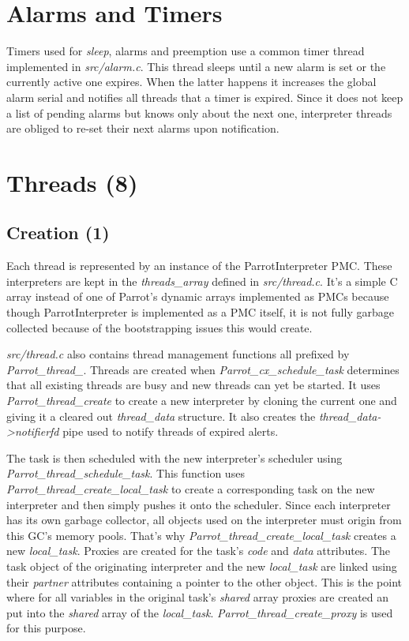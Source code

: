 \documentclass[bachelor,english]{hgbthesis}
\begin{document}
\section{Alarms and Timers}

Timers used for \textit{sleep}, alarms and preemption use a common timer thread implemented in \textit{src/alarm.c}. This thread sleeps until a new alarm is set or the currently active one expires. When the latter happens it increases the global alarm serial and notifies all threads that a timer is expired. Since it does not keep a list of pending alarms but knows only about the next one, interpreter threads are obliged to re-set their next alarms upon notification.

\section{Threads (8)}

\subsection{Creation (1)}
\label{subsec:thread_creation}

Each thread is represented by an instance of the ParrotInterpreter PMC. These interpreters are kept in the \textit{threads\_array} defined in \textit{src/thread.c}. It's a simple C array instead of one of Parrot's dynamic arrays implemented as PMCs because though ParrotInterpreter is implemented as a PMC itself, it is not fully garbage collected because of the bootstrapping issues this would create.

\textit{src/thread.c} also contains thread management functions all prefixed by \textit{Parrot\_thread\_}. Threads are created when \textit{Parrot\_cx\_schedule\_task} determines that all existing threads are busy and new threads can yet be started. It uses \textit{Parrot\_thread\_create} to create a new interpreter by cloning the current one and giving it a cleared out \textit{thread\_data} structure. It also creates the \textit{thread\_data->notifierfd} pipe used to notify threads of expired alerts.

The task is then scheduled with the new interpreter's scheduler using \textit{Parrot\_thread\_schedule\_task}. This function uses \textit{Parrot\_thread\_create\_local\_task} to create a corresponding task on the new interpreter and then simply pushes it onto the scheduler. Since each interpreter has its own garbage collector, all objects used on the interpreter must origin from this GC's memory pools. That's why \textit{Parrot\_thread\_create\_local\_task} creates a new \textit{local\_task}. Proxies are created for the task's \textit{code} and \textit{data} attributes. The task object of the originating interpreter and the new \textit{local\_task} are linked using their \textit{partner} attributes containing a pointer to the other object. This is the point where for all variables in the original task's \textit{shared} array proxies are created an put into the \textit{shared} array of the \textit{local\_task}. \textit{Parrot\_thread\_create\_proxy} is used for this purpose.
\end{document}
